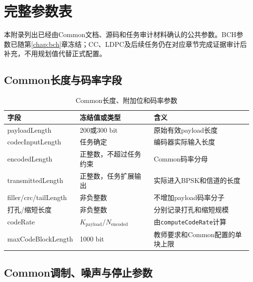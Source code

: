 \chapter{完整参数表}\label{app:parameters}

本附录列出已经由Common文档、源码和任务审计材料确认的公共参数。BCH参数已随第\ref{chap:bch}章冻结；CC、LDPC及后续任务仍在对应章节完成证据审计后补充，不用规划值代替正式配置。

\section{Common长度与码率字段}

\begin{table}[htbp]
  \centering
  \small
  \caption{Common长度、附加位和码率参数}
  \label{tab:app-common-lengths}
  \begin{tabular}{p{}p{}p{}}
    \toprule
    字段 & 冻结值或类型 & 含义 \\
    \midrule
    payloadLength & 200或300 bit & 原始有效payload长度 \\
    codecInputLength & 任务确定 & 编码器实际输入长度 \\
    encodedLength & 正整数，不超过任务约束 & Common码率分母 \\
    transmittedLength & 正整数，任务扩展输出 & 实际进入BPSK和信道的长度 \\
    filler/crc/tailLength & 非负整数 & 不增加payload码率分子 \\
    打孔/缩短长度 & 非负整数 & 分别记录打孔和缩短规模 \\
    codeRate & $K_{\mathrm{payload}}/N_{\mathrm{encoded}}$ & 由\texttt{computeCodeRate}计算 \\
    maxCodeBlockLength & 1000 bit & 教师要求和Common配置的单块上限 \\
    \bottomrule
  \end{tabular}
\end{table}

\section{Common调制、噪声与停止参数}

